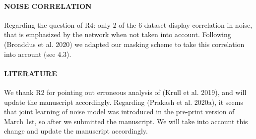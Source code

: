 \documentclass{article}
\begin{document}
\paragraph{NOISE CORRELATION}
Regarding the question of R4: only 2 of the 6 dataset display correlation in noise, that is emphasized by the network when not taken into account.
Following (Broaddus et al. 2020) we adapted our masking scheme to take this correlation into account (see 4.3).

\paragraph{LITERATURE}
We thank R2 for pointing out erroneous analysis of (Krull et al. 2019), and will update the manuscript accordingly.
Regarding (Prakash et al. 2020a), it seems that joint learning of noise model was introduced in the pre-print version of March 1st, so after we submitted the manuscript. We will take into account this change and update the manuscript accordingly.
\end{document}
